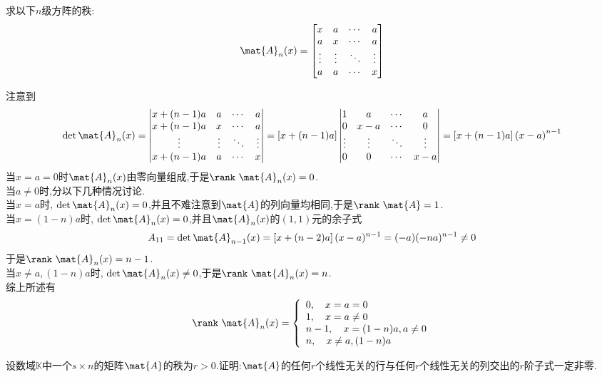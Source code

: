 \documentclass{ctexart}
\begin{document}
\begin{problem}
    求以下$n$级方阵的秩:
    \[\mat{A}_n(x)=\begin{bmatrix}
        x&a&\cdots&a\\
        a&x&\cdots&a\\
        \vdots&\vdots&\ddots&\vdots\\
        a&a&\cdots&x
    \end{bmatrix}\]
\end{problem}
\begin{solution}
    注意到
    \[\det\mat{A}_n(x)=\begin{vmatrix}
        x+(n-1)a&a&\cdots&a\\
        x+(n-1)a&x&\cdots&a\\
        \vdots&\vdots&\ddots&\vdots\\
        x+(n-1)a&a&\cdots&x
    \end{vmatrix}=\left[x+(n-1)a\right]\begin{vmatrix}
        1&a&\cdots&a\\
        0&x-a&\cdots&0\\
        \vdots&\vdots&\ddots&\vdots\\
        0&0&\cdots&x-a
    \end{vmatrix}=\left[x+(n-1)a\right]\left(x-a\right)^{n-1}\]
    当$x=a=0$时$\mat{A}_n(x)$由零向量组成,于是$\rank\ \mat{A}_n(x)=0$.\\
    当$a\neq0$时,分以下几种情况讨论.\\
    当$x=a$时, $\det\mat{A}_n(x)=0$,并且不难注意到$\mat{A}$的列向量均相同,于是$\rank\ \mat{A}=1$.\\
    当$x=(1-n)a$时, $\det\mat{A}_n(x)=0$,并且$\mat{A}_n(x)$的$(1,1)$元的余子式
    \[A_{11}=\det\mat{A}_{n-1}(x)=\left[x+(n-2)a\right](x-a)^{n-1}=(-a)(-na)^{n-1}\neq0\]
    于是$\rank\ \mat{A}_n(x)=n-1$.\\
    当$x\neq a,(1-n)a$时, $\det\mat{A}_n(x)\neq0$,于是$\rank\ \mat{A}_n(x)=n$.\\
    综上所述有
    \[\rank\ \mat{A}_n(x)=\left\{\begin{array}{l}
        0,\quad x=a=0\\
        1,\quad x=a\neq0\\
        n-1,\quad x=(1-n)a,a\neq0\\
        n,\quad x\neq a,(1-n)a 
    \end{array}\right.\]
\end{solution}
\begin{problem}
    设数域$\mathbb{K}$中一个$s\times n$的矩阵$\mat{A}$的秩为$r>0$.证明:$\mat{A}$的任何$r$个线性无关的行与任何$r$个线性无关的列交出的$r$阶子式一定非零.
\end{problem}
\end{document}
